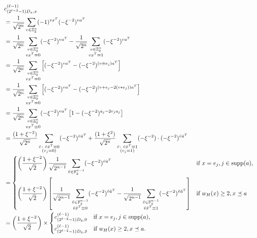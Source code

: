 \documentclass[twoside,romanappendices]{IEEEtran}
\newcommand{\Fn}{\mathbb{Z}_2^n}
\begin{document}
\begin{align}
& c_{(2^{\ell-2} - 1) D_a,x}^{(\ell-1)} \nonumber \\
%
  & = \frac{1}{\sqrt{2^n}} \sum_{v \in \Fn} (-1)^{vx^T} (-\xi^{-2})^{v a^T} \\
%
  & = \frac{1}{\sqrt{2^n}} \sum_{\substack{v \in \Fn\\vx^T \equiv 0}} (-\xi^{-2})^{v a^T} - \frac{1}{\sqrt{2^n}} \sum_{\substack{v \in \Fn\\vx^T \equiv 1}} (-\xi^{-2})^{v a^T} \\
%
  & = \frac{1}{\sqrt{2^n}} \sum_{\substack{v \in \Fn\\vx^T \equiv 0}} \left[ (-\xi^{-2})^{v a^T} - (-\xi^{-2})^{(v \oplus e_j) a^T} \right] \\
%
  & = \frac{1}{\sqrt{2^n}} \sum_{\substack{v \in \Fn\\vx^T \equiv 0}} \left[ (-\xi^{-2})^{v a^T} - (-\xi^{-2})^{(v + e_j - 2 (v \ast e_j)) a^T} \right] \\
%
  & = \frac{1}{\sqrt{2^n}} \sum_{\substack{v \in \Fn\\vx^T \equiv 0}} (-\xi^{-2})^{v a^T} \left[ 1 - (-\xi^{-2})^{a_j - 2 v_j a_j}  \right] \\
%
  & = \frac{(1 + \xi^{-2})}{\sqrt{2^n}} \sum_{\substack{\tilde{v} \colon \tilde{v} \tilde{x}^T \equiv 0\\(v_j = 0)}} (-\xi^{-2})^{\tilde{v} \tilde{a}^T} + \frac{(1 + \xi^2)}{\sqrt{2^n}} \sum_{\substack{\tilde{v} \colon \tilde{v} \tilde{x}^T \equiv 1\\(v_j = 1)}} (-\xi^{-2}) \cdot (-\xi^{-2})^{\tilde{v} \tilde{a}^T} \\
%
  & = 
\begin{dcases}
\left( \frac{1 + \xi^{-2}}{\sqrt{2}} \right) \frac{1}{\sqrt{2^{n-1}}} \sum_{\tilde{v} \in \mathbb{F}_2^{n-1}} (-\xi^{-2})^{\tilde{v} \tilde{a}^T} & \text{if}\ x = e_j, j \in \text{supp}(a), \\
%
\left( \frac{1 + \xi^{-2}}{\sqrt{2}} \right) \left[ \frac{1}{\sqrt{2^{n-1}}} \sum_{\substack{\tilde{v} \in \mathbb{F}_2^{n-1}\\\tilde{v} \tilde{x}^T \equiv 0}} (-\xi^{-2})^{\tilde{v} \tilde{a}^T} - \frac{1}{\sqrt{2^{n-1}}} \sum_{\substack{\tilde{v} \in \mathbb{F}_2^{n-1}\\\tilde{v} \tilde{x}^T \equiv 1}} (-\xi^{-2})^{\tilde{v} \tilde{a}^T} \right] & \text{if}\ w_H(x) \geq 2, x \preceq a
\end{dcases} \\
%
  & = \left( \frac{1 + \xi^{-2}}{\sqrt{2}} \right) \times 
\begin{dcases}
c_{(2^{\ell-2} - 1) D_{\tilde{a}},0}^{(\ell-1)} & \text{if}\ x = e_j, j \in \text{supp}(a), \\
%
c_{(2^{\ell-2} - 1) D_{\tilde{a}}, \tilde{x}}^{(\ell-1)} & \text{if}\ w_H(x) \geq 2, x \preceq a.
\end{dcases}
\end{align}
\end{document}

